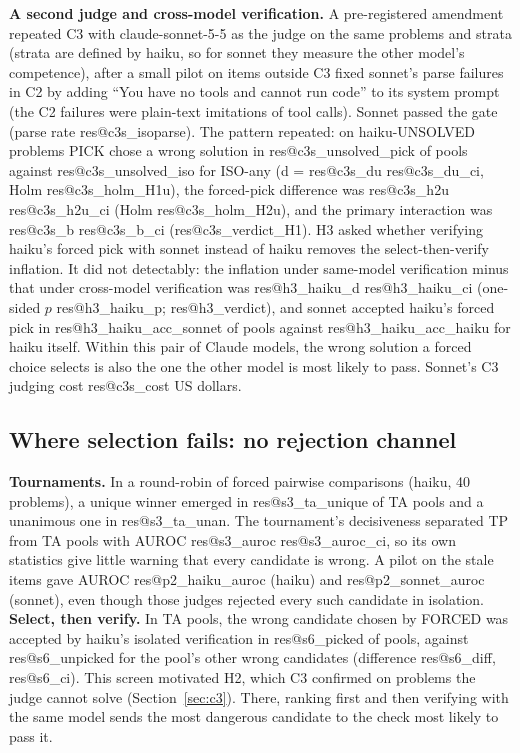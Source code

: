 \documentclass[10pt,twocolumn]{article}
\makeatletter
\newcommand{\res}[1]{\csname res@#1\endcsname}
\makeatother
\begin{document}
\textbf{A second judge and cross-model verification.} A pre-registered amendment repeated C3 with claude-sonnet-5-5 as the judge on the same problems and strata (strata are defined by haiku, so for sonnet they measure the other model's competence), after a small pilot on items outside C3 fixed sonnet's parse failures in C2 by adding ``You have no tools and cannot run code'' to its system prompt (the C2 failures were plain-text imitations of tool calls). Sonnet passed the gate (parse rate \res{c3s_isoparse}). The pattern repeated: on haiku-UNSOLVED problems PICK chose a wrong solution in \res{c3s_unsolved_pick} of pools against \res{c3s_unsolved_iso} for ISO-any (d = \res{c3s_du} \res{c3s_du_ci}, Holm \res{c3s_holm_H1u}), the forced-pick difference was \res{c3s_h2u} \res{c3s_h2u_ci} (Holm \res{c3s_holm_H2u}), and the primary interaction was \res{c3s_b} \res{c3s_b_ci} (\res{c3s_verdict_H1}). H3 asked whether verifying haiku's forced pick with sonnet instead of haiku removes the select-then-verify inflation. It did not detectably: the inflation under same-model verification minus that under cross-model verification was \res{h3_haiku_d} \res{h3_haiku_ci} (one-sided $p$ \res{h3_haiku_p}; \res{h3_verdict}), and sonnet accepted haiku's forced pick in \res{h3_haiku_acc_sonnet} of pools against \res{h3_haiku_acc_haiku} for haiku itself. Within this pair of Claude models, the wrong solution a forced choice selects is also the one the other model is most likely to pass. Sonnet's C3 judging cost \res{c3s_cost} US dollars.

\subsection{Where selection fails: no rejection channel}
\textbf{Tournaments.} In a round-robin of forced pairwise comparisons (haiku, 40 problems), a unique winner emerged in \res{s3_ta_unique} of TA pools and a unanimous one in \res{s3_ta_unan}. The tournament's decisiveness separated TP from TA pools with AUROC \res{s3_auroc} \res{s3_auroc_ci}, so its own statistics give little warning that every candidate is wrong. A pilot on the stale items gave AUROC \res{p2_haiku_auroc} (haiku) and \res{p2_sonnet_auroc} (sonnet), even though those judges rejected every such candidate in isolation.
\textbf{Select, then verify.} In TA pools, the wrong candidate chosen by FORCED was accepted by haiku's isolated verification in \res{s6_picked} of pools, against \res{s6_unpicked} for the pool's other wrong candidates (difference \res{s6_diff}, \res{s6_ci}). This screen motivated H2, which C3 confirmed on problems the judge cannot solve (Section~\ref{sec:c3}). There, ranking first and then verifying with the same model sends the most dangerous candidate to the check most likely to pass it.
\end{document}
